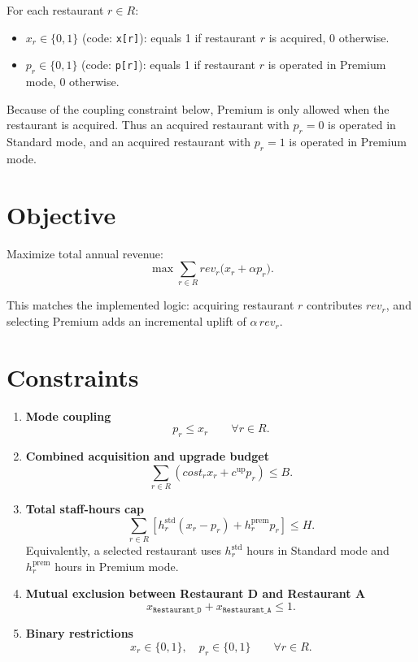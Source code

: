 For each restaurant $r \in R$:
\begin{itemize}
    \item $x_r \in \{0,1\}$ (code: \texttt{x[r]}): equals 1 if restaurant $r$ is acquired, 0 otherwise.
    \item $p_r \in \{0,1\}$ (code: \texttt{p[r]}): equals 1 if restaurant $r$ is operated in Premium mode, 0 otherwise.
\end{itemize}

Because of the coupling constraint below, Premium is only allowed when the restaurant is acquired. Thus an acquired restaurant with $p_r=0$ is operated in Standard mode, and an acquired restaurant with $p_r=1$ is operated in Premium mode.

\section*{Objective}

Maximize total annual revenue:
\[
\max \sum_{r \in R} rev_r \bigl(x_r + \alpha p_r\bigr).
\]

This matches the implemented logic: acquiring restaurant $r$ contributes $rev_r$, and selecting Premium adds an incremental uplift of $\alpha \, rev_r$.

\section*{Constraints}

\begin{enumerate}
    \item \textbf{Mode coupling}
    \[
    p_r \le x_r \qquad \forall r \in R.
    \]

    \item \textbf{Combined acquisition and upgrade budget}
    \[
    \sum_{r \in R} \left(cost_r x_r + c^{\mathrm{up}} p_r\right) \le B.
    \]

    \item \textbf{Total staff-hours cap}
    \[
    \sum_{r \in R} \left[h^{\mathrm{std}}_r (x_r - p_r) + h^{\mathrm{prem}}_r p_r\right] \le H.
    \]
    Equivalently, a selected restaurant uses $h^{\mathrm{std}}_r$ hours in Standard mode and $h^{\mathrm{prem}}_r$ hours in Premium mode.

    \item \textbf{Mutual exclusion between Restaurant D and Restaurant A}
    \[
    x_{\texttt{Restaurant\_D}} + x_{\texttt{Restaurant\_A}} \le 1.
    \]

    \item \textbf{Binary restrictions}
    \[
    x_r \in \{0,1\}, \quad p_r \in \{0,1\} \qquad \forall r \in R.
    \]
\end{enumerate}

